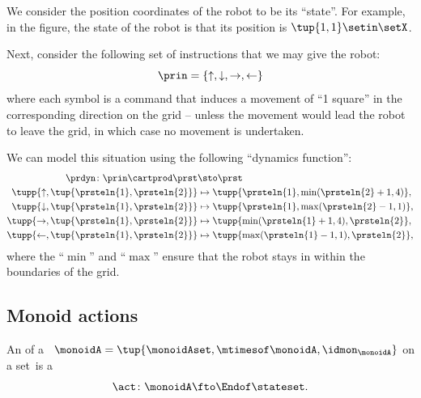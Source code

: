     \begin{marginfigure}
        \centering
        \caption{Robot on a grid example. }
        \label{fig:robot_example}
    \end{marginfigure}

    We consider the position coordinates of the robot to be its ``state''.  For example, in the figure, the state of the robot is that its position is $\tup{1,1} \setin \setX$. 
    
    
    Next, consider the following set of instructions that we may give the robot: 
\begin{equation}
\prin=\{\uparrow, \downarrow,\rightarrow,\leftarrow\}
\end{equation}
where each symbol is a command that induces a movement of ``1 square'' in the corresponding direction on the grid -- unless the movement would lead the robot to leave the grid, in which case no movement is undertaken. 


We can model this situation using the following  ``dynamics function'': 
    \begin{equation}
        \begin{aligned}
            \prdyn\colon \prin \cartprod \prst                & \sto \prst \\
            \tupp{\uparrow, \tup{\prsteln{1},\prsteln{2}}}    & \mapsto \tupp{\prsteln{1}, \min(\prsteln{2}+1,4)}, \\
            \tupp{\downarrow, \tup{\prsteln{1},\prsteln{2}}}  & \mapsto \tupp{\prsteln{1}, \max(\prsteln{2}-1,1)}, \\
            \tupp{\rightarrow, \tup{\prsteln{1},\prsteln{2}}} & \mapsto \tupp{\min(\prsteln{1}+1,4), \prsteln{2}}, \\
            \tupp{\leftarrow, \tup{\prsteln{1},\prsteln{2}}}  & \mapsto \tupp{\max(\prsteln{1}-1,1), \prsteln{2}}, \\
        \end{aligned}
    \end{equation}
    where the ``$\min$'' and ``$\max$'' ensure that the robot stays in within the boundaries of the grid.
    


\subsection{Monoid actions}

\begin{ctdefinition}
    \label{def:monoid-cov-action}
    An  of a ~$\monoidA = \tup{\monoidAset, \mtimesof\monoidA, \idmon_\monoidA}$ on a set~\stateset is a 
    \begin{equation}
        \label{eq:act-monoid}
        \act \colon \monoidA \fto \Endof\stateset.
    \end{equation}
\end{ctdefinition}

